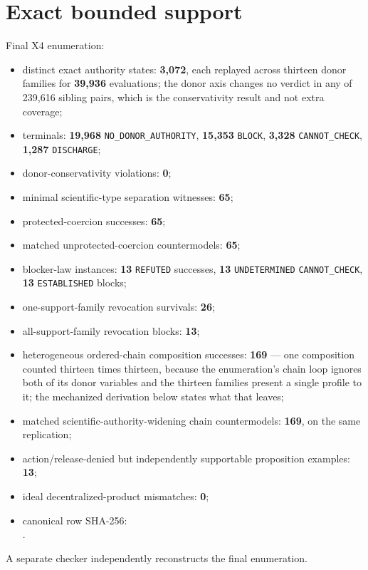 \section{Exact bounded support}

Final X4 enumeration:

\begin{itemize}
  \item distinct exact authority states: \textbf{3,072}, each replayed across thirteen donor families for \textbf{39,936} evaluations; the donor axis changes no verdict in any of 239,616 sibling pairs, which is the conservativity result and not extra coverage;
  \item terminals: \textbf{19,968} \texttt{NO_DONOR_AUTHORITY}, \textbf{15,353} \texttt{BLOCK}, \textbf{3,328} \texttt{CANNOT_CHECK}, \textbf{1,287} \texttt{DISCHARGE};
  \item donor-conservativity violations: \textbf{0};
  \item minimal scientific-type separation witnesses: \textbf{65};
  \item protected-coercion successes: \textbf{65};
  \item matched unprotected-coercion countermodels: \textbf{65};
  \item blocker-law instances: \textbf{13} \texttt{REFUTED} successes, \textbf{13} \texttt{UNDETERMINED} \texttt{CANNOT_CHECK}, \textbf{13} \texttt{ESTABLISHED} blocks;
  \item one-support-family revocation survivals: \textbf{26};
  \item all-support-family revocation blocks: \textbf{13};
  \item heterogeneous ordered-chain composition successes: \textbf{169} --- one composition counted thirteen times thirteen, because the enumeration's chain loop ignores both of its donor variables and the thirteen families present a single profile to it; the mechanized derivation below states what that leaves;
  \item matched scientific-authority-widening chain countermodels: \textbf{169}, on the same replication;
  \item action/release-denied but independently supportable proposition examples: \textbf{13};
  \item ideal decentralized-product mismatches: \textbf{0};
  \item canonical row SHA-256:\\
    .
\end{itemize}

A separate checker independently reconstructs the final enumeration.
